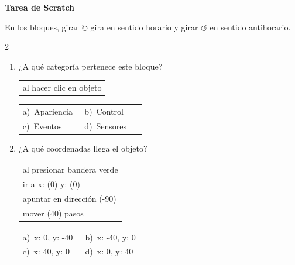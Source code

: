 \documentclass[11pt,a4paper]{article}
\begin{document}
\frenchspacing
{\Large\bfseries Tarea de Scratch}
\vspace{6pt}

En los bloques, girar $\circlearrowright$ gira en sentido horario y girar $\circlearrowleft$ en sentido antihorario.
\vspace{10pt}
\begin{multicols}{2}
\begin{enumerate}[label=\textbf{\arabic*.},leftmargin=*,itemsep=10pt,topsep=0pt]
\item \begin{minipage}[t]{\linewidth}
¿A qué categoría pertenece este bloque?
\par\vspace{3pt}\hspace*{1em}\begin{tabular}{@{}l@{}}\ttfamily\small al hacer clic en objeto
\end{tabular}\par

\vspace{4pt}
\begin{tabular}{@{}>{\raggedright\arraybackslash}p{0.47\linewidth}>{\raggedright\arraybackslash}p{0.47\linewidth}@{}}
a)~Apariencia & b)~Control \\
c)~Eventos & d)~Sensores \\
\end{tabular}
\end{minipage}

\item \begin{minipage}[t]{\linewidth}
¿A qué coordenadas llega el objeto?
\par\vspace{3pt}\hspace*{1em}\begin{tabular}{@{}l@{}}\ttfamily\small al presionar bandera verde \\
\ttfamily\small ir a x: (0) y: (0) \\
\ttfamily\small apuntar en dirección (-90) \\
\ttfamily\small mover (40) pasos
\end{tabular}\par

\vspace{4pt}
\begin{tabular}{@{}>{\raggedright\arraybackslash}p{0.47\linewidth}>{\raggedright\arraybackslash}p{0.47\linewidth}@{}}
a)~x: 0, y: -40 & b)~x: -40, y: 0 \\
c)~x: 40, y: 0 & d)~x: 0, y: 40 \\
\end{tabular}
\end{minipage}


\end{enumerate}
\end{multicols}
\end{document}
